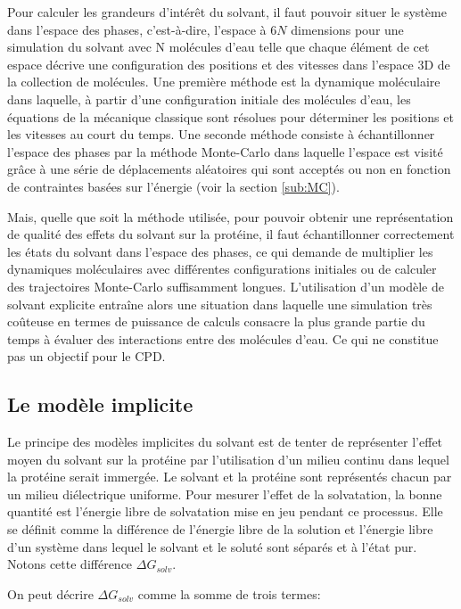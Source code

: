 Pour calculer les grandeurs d'intérêt du solvant, il faut pouvoir situer le système dans l'espace des phases, c'est-à-dire, l'espace à $6 N$ dimensions pour une simulation du solvant avec N molécules d'eau telle que chaque élément de cet espace décrive une configuration des positions et des vitesses dans l'espace 3D de la collection de molécules.
Une première méthode est la dynamique moléculaire dans laquelle, à partir d'une configuration initiale des molécules d'eau, les équations de la mécanique classique sont résolues pour déterminer les positions et les vitesses au court du temps. Une seconde méthode consiste à échantillonner l'espace des phases par la méthode Monte-Carlo dans laquelle l'espace est visité grâce à une série de déplacements aléatoires qui sont acceptés ou non en fonction de contraintes basées sur l'énergie (voir la section \ref{sub:MC}).

Mais, quelle que soit la méthode utilisée, pour pouvoir obtenir une représentation de qualité des effets du solvant sur la protéine, il faut échantillonner correctement les états du solvant dans l'espace des phases, ce qui demande de multiplier les dynamiques moléculaires avec différentes configurations initiales ou de calculer des trajectoires Monte-Carlo suffisamment longues.
L'utilisation d'un modèle de solvant explicite entraîne alors une situation dans laquelle une simulation très coûteuse en termes de puissance de calculs consacre la plus grande partie du temps à évaluer des interactions entre des molécules d'eau. Ce qui ne constitue pas un objectif pour le CPD.

\subsection{Le modèle implicite}

Le principe des modèles implicites du solvant est de tenter de représenter l'effet moyen du solvant sur la protéine par l'utilisation d'un milieu continu dans lequel la protéine serait immergée. Le solvant et la protéine sont représentés chacun par un milieu diélectrique uniforme.
Pour mesurer l'effet de la solvatation, la bonne quantité est l'énergie libre de solvatation mise en jeu pendant ce processus. Elle se définit comme la différence de l'énergie libre de la solution et l'énergie libre d'un système dans lequel le solvant et le soluté sont séparés et à l'état pur. Notons cette différence $\Delta G_{solv}$.

On peut décrire $\Delta G_{solv}$ comme la somme de trois termes:


